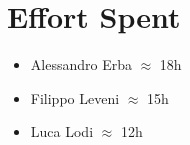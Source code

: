 \documentclass[english]{article}
\begin{document}
\clearpage
\section{Effort Spent} %
	\begin{itemize}
		\item Alessandro Erba $\approx$ 18h
		\item Filippo Leveni 	$\approx$ 15h
		\item Luca Lodi $\approx$ 12h
	\end{itemize}
\end{document}
